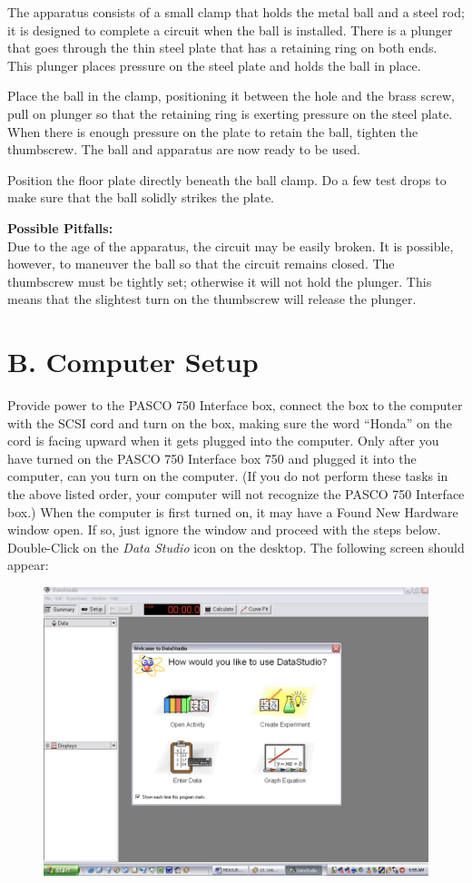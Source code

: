   The apparatus consists of a small clamp that holds the metal ball and a steel rod;
it is designed to complete a circuit when the ball is installed. There is a plunger
that goes through the thin steel plate that has a retaining ring on both ends.
This plunger places pressure on the steel plate and holds the ball in place.

  Place the ball in the clamp, positioning it between the hole and the brass screw, pull on
plunger so that the retaining ring is exerting pressure on the steel plate. When there is enough
pressure on the plate to retain the ball, tighten the thumbscrew. The ball and apparatus are now
ready to be used.

  Position the floor plate directly beneath the ball clamp. Do a few test drops to make sure
that the ball solidly strikes the plate.

\textbf{Possible Pitfalls:} \\
  Due to the age of the apparatus, the circuit may be easily broken. It is possible, however, to
maneuver the ball so that the circuit remains closed.
  The thumbscrew must be tightly set; otherwise it will not hold the plunger. This means that
the slightest turn on the thumbscrew will release the plunger.

\section{B. Computer Setup}
  Provide power to the PASCO 750 Interface box, connect the box to the computer with the
SCSI cord and turn on the box, making sure the word “Honda” on the cord is facing upward when
it gets plugged into the computer. Only after you have turned on the PASCO 750 Interface
box 750 and plugged it into the computer, can you turn on the computer. (If you do not
perform these tasks in the above listed order, your computer will not recognize the PASCO
750 Interface box.) When the computer is first turned on, it may have a Found New Hardware
window open. If so, just ignore the window and proceed with the steps below.
  Double-Click on the \emph{Data Studio} icon on the desktop. The following screen should appear:

\begin{figure}[ht]
  \centerline{\includegraphics[scale=0.4]{resources/photo2.jpg}}
\end{figure}

